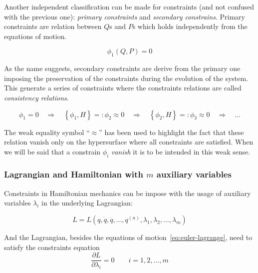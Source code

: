 Another independent classification can be made for constraints (and not confused
with the previous one): \emph{primary constraints} and \emph{secondary
constrains}.  Primary constraints are relation between $Q$s and $P$s which holds
independently from the equations of motion.

\begin{equation} \label{eq:constraint}
  \phi_1(Q, P) = 0
\end{equation}

As the name suggests, secondary constraints are derive from the primary one
imposing the preservation of the constraints during the evolution of the system.
This generate a series of constraints where the constraints relations are called
\emph{consistency relations}.

\begin{equation} \label{eq:consistency_relations}
  \phi_1 = 0 \quad \Rightarrow \quad
  \left\{ \phi_1 , H \right\} =: \phi_2 \approx 0 \quad \Rightarrow \quad
  \left\{ \phi_2 , H \right\} =: \phi_3 \approx 0 \quad \Rightarrow \quad
  \ldots
\end{equation}

The weak equality symbol ``$\approx$'' has been used to highlight the fact that
these relation vanish only on the hypersurface where all constraints are
satisfied. When we will be said that a constrain $\phi_i$ \emph{vanish} it is to
be intended in this weak sense.

\subsubsection{Lagrangian and Hamiltonian with $m$ auxiliary variables}
Constraints in Hamiltonian mechanics can be impose with the usage of auxiliary
variables $\lambda_i$ in the underlying Lagrangian:

\begin{equation*}
  L = L(
  q, \dot{q}, \ddot{q}, \ldots, q^{(n)},
  \lambda_1, \lambda_2, \ldots, \lambda_m
  )
\end{equation*}

And the Lagrangian, besides the equations of motion~\eqref{eq:euler-lagrange},
need to satisfy the constraints equation
\begin{equation}
  \frac{\partial L}{\partial \lambda_i} = 0 \qquad i=1, 2, \ldots, m
\end{equation}

